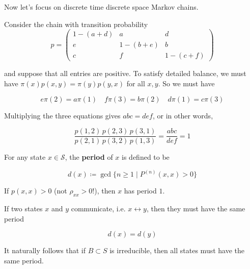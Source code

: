 	Now let's focus on discrete time discrete space Markov chains. 

	\begin{example}
		\label{ex:a-two-parameter-transition-matrix}
		Consider the chain with transition probability 
		\begin{equation}
			p = \begin{pmatrix} 1 - (a + d) & a & d \\ e & 1 - (b + e) & b \\ c & f & 1 - (c + f) \end{pmatrix}
		\end{equation}

		and suppose that all entries are positive. To satisfy detailed balance, we must have $\pi(x) p(x, y) = \pi(y) p(y, x)$ for all $x, y$. So we must have

		\begin{equation}
			e \pi(2) = a \pi(1) \quad f \pi(3) = b \pi(2) \quad d \pi(1) = c \pi(3)
		\end{equation}

		Multiplying the three equations gives $abc = def$, or in other words, 

		\begin{equation}
			\frac{p(1, 2) \, p(2, 3) \, p(3, 1)}{p(2, 1)\, p(3, 2) \, p(1, 3)} = \frac{abc}{def} = 1
		\end{equation}
	\end{example}

	\begin{definition}[Period]
		\label{def:period}
		For any state $x \in \mathcal{S}$, the \textbf{period} of $x$ is defined to be

			\begin{equation}
				d(x) \coloneqq \gcd \{n \geq 1 \; | \; P^{(n)} (x, x) > 0\}
			\end{equation}
	\end{definition}

	\begin{lemma}
		\label{thm:self-loops-give-period-1}
		If $p(x, x) > 0$ (not $\rho_{xx} > 0$!), then $x$ has period $1$. 
	\end{lemma}

	\begin{theorem}
		\label{thm:communicating-states-share-a-period}
		If two states $x$ and $y$ communicate, i.e. $x \leftrightarrow y$, then they must have the same period

			\begin{equation}
				d(x) = d(y)
			\end{equation}

		It naturally follows that if $B \subset S$ is irreducible, then all states must have the same period. 
	\end{theorem}

